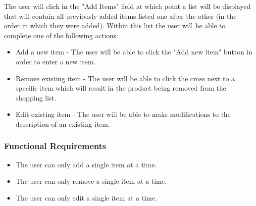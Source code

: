 \documentclass[10pt, a4paper, onecolumn]{scrartcl}
\begin{document}
				The user will click in the "Add Items" field at which point a list will be displayed that will contain all previously added items listed one after the other (in the order in which they were added). Within this list the user will be able to complete one of the following actions:
				
				\begin{itemize}
					\item Add a new item - The user will be able to click the "Add new item" button in order to enter a new item. 
					\item Remove existing item - The user will be able to click the cross next to a specific item which will result in the product being removed from the shopping list.
					\item Edit existing item - The user will be able to make modifications to the description of an existing item.
				\end{itemize}
			
			\subsubsection{Functional Requirements}
			
				\begin{itemize}
					\item The user can only add a single item at a time.
					\item The user can only remove a single item at a time.
					\item The user can only edit a single item at a time.
				\end{itemize}
			
%			
%			
%				
%			
		
\end{document}
